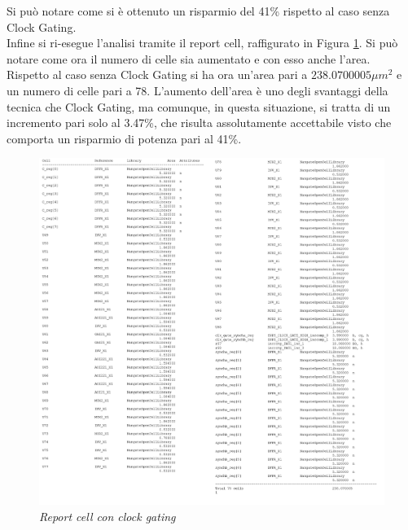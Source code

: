 Si può notare come si è ottenuto un risparmio del 41\% rispetto al caso senza Clock Gating. \\
Infine si ri-esegue l'analisi tramite il report cell, raffigurato in Figura \ref{3_11}. Si può notare come ora il numero di celle sia aumentato e con esso anche l'area.\\
Rispetto al caso senza Clock Gating si ha ora un'area pari a $238.0700005 \mu m^{2}$ e un numero di celle pari a 78. L'aumento dell'area è uno degli svantaggi della tecnica che Clock Gating, ma comunque, in questa situazione, si tratta di un incremento pari solo al 3.47\%, che risulta assolutamente accettabile visto che comporta un risparmio di potenza pari al 41\%.
\begin{figure}[!htb]
	\centering
	\includegraphics[scale=0.65]{immagini/3_11}
	\caption{\textit{Report cell con clock gating}}
	\label{3_11}
\end{figure}

